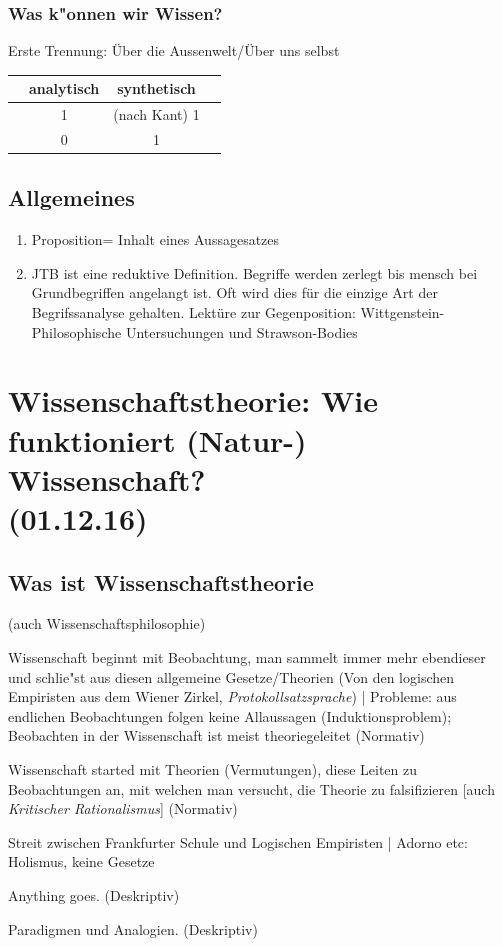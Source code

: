 \documentclass[emulatestandardclasses]{scrartcl}
\begin{document}
	\subsubsection{Was k"onnen wir Wissen?} 
	Erste Trennung: Über die Aussenwelt/Über uns selbst
	\begin{table}[hbt]
  \begin{tabular}{l|c|c|r}
    &analytisch &synthetisch \\
    \hline
    &1 & (nach Kant) 1 \\
    &0 &1
  \end{tabular}
\end{table}


\subsection{Allgemeines}
\begin{enumerate}
\item Proposition= Inhalt eines Aussagesatzes
\item JTB ist eine reduktive Definition. Begriffe werden zerlegt bis mensch bei Grundbegriffen angelangt ist. Oft wird dies für die einzige Art der Begrifssanalyse gehalten.  Lektüre zur Gegenposition: Wittgenstein-Philosophische Untersuchungen und Strawson-Bodies 
\end{enumerate}


\section{Wissenschaftstheorie: Wie funktioniert (Natur-) Wissenschaft?\\(01.12.16)}

\subsection{Was ist Wissenschaftstheorie}

\begin{description}[leftmargin=!,labelwidth=\widthof{\bfseries Poppers Falsifikationismus}]
  \item[Wissenschaftstheorie] (auch Wissenschaftsphilosophie)
  \item[Induktivismus] Wissenschaft beginnt mit Beobachtung, man sammelt immer mehr ebendieser und schlie"st aus diesen allgemeine Gesetze/Theorien (Von den logischen Empiristen aus dem Wiener Zirkel, \emph{Protokollsatzsprache}) | Probleme: aus endlichen Beobachtungen folgen keine Allaussagen (Induktionsproblem); Beobachten in der Wissenschaft ist meist theoriegeleitet (Normativ)
  \item[Poppers Falsifikationismus] Wissenschaft started mit Theorien (Vermutungen), diese Leiten zu Beobachtungen an, mit welchen man versucht, die Theorie zu falsifizieren [auch \emph{Kritischer Rationalismus}] (Normativ)
  \item[Positivismusstreit] Streit zwischen Frankfurter Schule und Logischen Empiristen | Adorno etc: Holismus, keine Gesetze
  \item[Feyerabend] Anything goes. (Deskriptiv)
  \item[Kuhn] Paradigmen und Analogien. (Deskriptiv)
\end{description}
\end{document}
